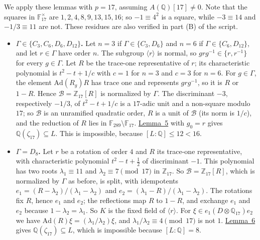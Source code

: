 \documentclass[11pt]{article}
\newcommand{\Q}{\mathbb Q}
\newcommand{\Z}{\mathbb Z}
\newcommand{\F}{\mathbb F}
\begin{document}
\medskip
We apply these lemmas with \(p=17\), assuming \(A(\Q)[17]\neq0\). Note that the squares in
\(\F_{17}^\times\) are \(1,2,4,8,9,13,15,16\); so \(-1\equiv4^2\) is a square, while
\(-3\equiv14\) and \(-1/3\equiv11\) are not. These residues are also verified in part (B) of the
script.
\begin{itemize}
\item \textbf{\(\Gamma\in\{C_3,C_6,D_6,D_{12}\}\).} Let \(n=3\) if \(\Gamma\in\{C_3,D_6\}\) and
\(n=6\) if \(\Gamma\in\{C_6,D_{12}\}\), and let \(r\in\Gamma\) have order \(n\). The subgroup \(\langle r\rangle\) is
normal, so \(grg^{-1}\in\{r,r^{-1}\}\) for every \(g\in\Gamma\). Let \(R\) be the trace-one
representative of \(r\); its characteristic polynomial is \(t^2-t+1/c\) with \(c=1\) for \(n=3\)
and \(c=3\) for \(n=6\). For \(g\in\Gamma\), the element \(\mathrm{Ad}(R_g)R\) has trace one and
represents \(grg^{-1}\), so it is \(R\) or \(1-R\). Hence \(\mathcal B=\Z_{17}[R]\) is normalized by
\(\Gamma\). The discriminant \(-3\), respectively \(-1/3\), of \(t^2-t+1/c\) is a \(17\)-adic
unit and a non-square modulo \(17\); so \(\mathcal B\) is an unramified quadratic order, \(R\) is a unit
of \(\mathcal B\) (its norm is \(1/c\)), and the reduction of \(R\) lies in \(\F_{289}\setminus\F_{17}\).
\hyperref[lemma-unram]{Lemma~5} with \(g_0=r\) gives \(\Q(\zeta_{17})\subseteq L\). This is
impossible, because \([L:\Q]\le12<16\).

\item \textbf{\(\Gamma=D_8\).} Let \(r\) be a rotation of order \(4\) and \(R\) its trace-one
representative, with characteristic polynomial \(t^2-t+\tfrac12\) of discriminant \(-1\). This
polynomial has two roots \(\lambda_1\equiv11\) and \(\lambda_2\equiv7\pmod{17}\) in \(\Z_{17}\).
So \(\mathcal B=\Z_{17}[R]\), which is normalized by \(\Gamma\) as before, is split, with idempotents
\(e_1=(R-\lambda_2)/(\lambda_1-\lambda_2)\) and \(e_2=(\lambda_1-R)/(\lambda_1-\lambda_2)\). The
rotations fix \(R\), hence \(e_1\) and \(e_2\); the reflections map \(R\) to \(1-R\), and
exchange \(e_1\) and \(e_2\) because \(1-\lambda_2=\lambda_1\). So \(K\) is the fixed field of
\(\langle r\rangle\). For \(\xi\in e_1(D\otimes\Q_{17})e_2\) we have
\(\mathrm{Ad}(R)\xi=(\lambda_1/\lambda_2)\xi\), and \(\lambda_1/\lambda_2\equiv4\pmod{17}\) is
not \(1\). \hyperref[lemma-split]{Lemma~6} gives \(\Q(\zeta_{17})\subseteq L\), which is
impossible because \([L:\Q]=8\).


\end{itemize}
\end{document}

